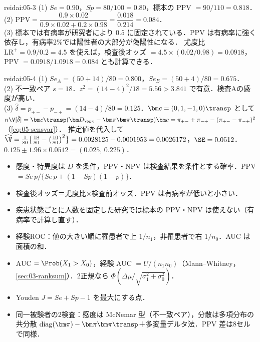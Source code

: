 \begin{kaitou}{reidai:05-3}
(1) $Se=0.90$，$Sp=80/100=0.80$，標本の PPV $=90/110=0.818$．\\
(2) $\mathrm{PPV}=\dfrac{0.9\times0.02}{0.9\times0.02+0.2\times0.98}=\dfrac{0.018}{0.214}=0.084$．\\
(3) 標本では有病率が研究者により $0.5$ に固定されている．PPV は有病率に強く依存し，有病率2\%では陽性者の大部分が偽陽性になる．
尤度比 $\mathrm{LR}^+=0.9/0.2=4.5$ を使えば，検査後オッズ $=4.5\times(0.02/0.98)=0.0918$，PPV $=0.0918/1.0918=0.084$ とも計算できる．
\end{kaitou}

\begin{kaitou}{reidai:05-4}
(1) $Se_A=(50+14)/80=0.800$，$Se_B=(50+4)/80=0.675$．\\
(2) 不一致ペア $s=18$．$z^2=(14-4)^2/18=5.56>3.841$ で有意．検査Aの感度が高い．\\
(3) $\hat\delta=p_{+-}-p_{-+}=(14-4)/80=0.125$．$\bm c=(0,1,-1,0)\transp$ として
$n\V[\hat\delta]=\bm c\transp(\bm D_{\bm\pi}-\bm\pi\bm\pi\transp)\bm c=\pi_{+-}+\pi_{-+}-(\pi_{+-}-\pi_{-+})^2$（\cref{eq:05-sensvar}）．
推定値を代入して $\widehat\V=\frac{1}{80}\bigl\{\frac{18}{80}-\bigl(\frac{10}{80}\bigr)^2\bigr\}=0.0028125-0.0001953=0.0026172$，$\SE=0.0512$．
$0.125\pm1.96\times0.0512=(0.025,\,0.225)$．
\end{kaitou}

\begin{summarybox}
\begin{itemize}
\item 感度・特異度は $D$ を条件，PPV・NPV は検査結果を条件とする確率．PPV $=Se\,p/\{Se\,p+(1-Sp)(1-p)\}$．
\item 検査後オッズ＝尤度比×検査前オッズ．PPV は有病率が低いと小さい．
\item 疾患状態ごとに人数を固定した研究では標本の PPV・NPV は使えない（有病率で計算し直す）．
\item 経験ROC：値の大きい順に罹患者で上 $1/n_1$，非罹患者で右 $1/n_0$．AUC は面積の和．
\item AUC $=\Prob(X_1>X_0)$，経験 AUC $=U/(n_1n_0)$（Mann--Whitney，\cref{sec:03-ranksum}）．2正規なら $\Phi(\Delta\mu/\sqrt{\sigma_1^2+\sigma_0^2})$．
\item Youden $J=Se+Sp-1$ を最大にする点．
\item 同一被験者の2検査：感度は McNemar 型（不一致ペア），分散は多項分布の共分散 $\mathrm{diag}(\bm\pi)-\bm\pi\bm\pi\transp$＋多変量デルタ法．PPV 差は8セルで同様．
\end{itemize}
\end{summarybox}
